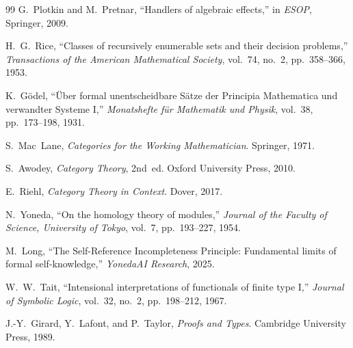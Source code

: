 \documentclass[11pt]{article}
\begin{document}
\begin{thebibliography}{99}
G.~Plotkin and M.~Pretnar, ``Handlers of algebraic effects,'' in
\textit{ESOP}, Springer, 2009.

H.~G.~Rice, ``Classes of recursively enumerable sets and their decision
problems,'' \textit{Transactions of the American Mathematical Society},
vol.~74, no.~2, pp.~358--366, 1953.

K.~G\"{o}del, ``\"{U}ber formal unentscheidbare S\"{a}tze der Principia
Mathematica und verwandter Systeme I,'' \textit{Monatshefte f\"{u}r
Mathematik und Physik}, vol.~38, pp.~173--198, 1931.

S.~Mac~Lane, \textit{Categories for the Working Mathematician}. Springer, 1971.

S.~Awodey, \textit{Category Theory}, 2nd~ed. Oxford University Press, 2010.

E.~Riehl, \textit{Category Theory in Context}. Dover, 2017.

N.~Yoneda, ``On the homology theory of modules,'' \textit{Journal of the
Faculty of Science, University of Tokyo}, vol.~7, pp.~193--227, 1954.

M.~Long, ``The Self-Reference Incompleteness Principle: Fundamental limits of
formal self-knowledge,'' \textit{YonedaAI Research}, 2025.

W.~W.~Tait, ``Intensional interpretations of functionals of finite type I,''
\textit{Journal of Symbolic Logic}, vol.~32, no.~2, pp.~198--212, 1967.

J.-Y.~Girard, Y.~Lafont, and P.~Taylor, \textit{Proofs and Types}.
Cambridge University Press, 1989.

\end{thebibliography}
\end{document}
